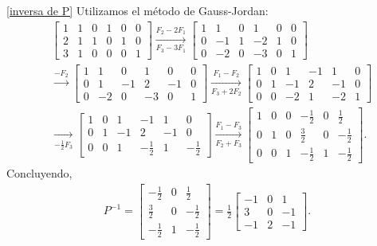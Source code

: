 \begin{enumerate}[topsep=6pt, itemsep=.4cm]
\rta 

\ref{inversa de P} Utilizamos el método de Gauss-Jordan:
\begin{align*}
    &\left[\begin{array}{ccc|ccc}
    1&1&0&1&0&0\\2&1&1&0&1&0\\3&1&0&0&0&1
    \end{array}\right] \underset{F_3-3F_1}{\stackrel{F_2-2F_1}{\longrightarrow}} \left[\begin{array}{ccc|ccc}
    1&1&0&1&0&0\\0&-1&1&-2&1&0\\0&-2&0&-3&0&1
    \end{array}\right] \\
    &\stackrel{-F_2}{\longrightarrow} \left[\begin{array}{ccc|ccc}
    1&1&0&1&0&0\\0&1&-1&2&-1&0\\0&-2&0&-3&0&1
    \end{array}\right] \underset{F_3+2F_2}{\stackrel{F_1-F_2}{\longrightarrow}} 
    \left[\begin{array}{ccc|ccc}
    1&0&1&-1&1&0\\0&1&-1&2&-1&0\\0&0&-2&1&-2&1
    \end{array}\right] \\
    &\underset{-\frac{1}{2}F_3}{\longrightarrow} \left[\begin{array}{ccc|ccc}
    1&0&1&-1&1&0\\0&1&-1&2&-1&0\\0&0&1&-\frac{1}{2}&1&-\frac{1}{2}
    \end{array}\right] \underset{F_2+F_3}{\stackrel{F_1-F_3}{\longrightarrow}}
    \left[\begin{array}{ccc|ccc}
    1&0&0&-\frac{1}{2}&0&\frac{1}{2}\\0&1&0&\frac{3}{2}&0&-\frac{1}{2}\\0&0&1&-\frac{1}{2}&1&-\frac{1}{2}
    \end{array}\right].
\end{align*}
Concluyendo, 
\begin{align*}
    P^{-1} = \begin{bmatrix}
        -\frac{1}{2}&0&\frac{1}{2}\\
        \frac{3}{2}&0&-\frac{1}{2}\\
        -\frac{1}{2}&1&-\frac{1}{2}
    \end{bmatrix} = \frac12 \begin{bmatrix}
        -1&0&1\\
        3&0&-1\\
        -1&2&-1
    \end{bmatrix}.
\end{align*} 


\end{enumerate}
